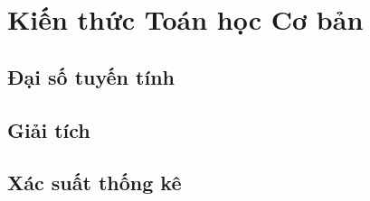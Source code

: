 \chapter{Kiến thức Toán học Cơ bản}

\section{Đại số tuyến tính}
\section{Giải tích}
\section{Xác suất thống kê}
